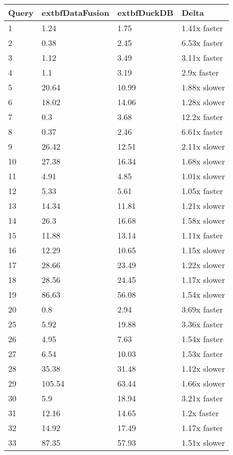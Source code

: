 \begin{table}[h]
\centering
\begin{tabular}{|l|l|l|l|}
\hline
Query & 	extbf{DataFusion} & 	extbf{DuckDB} & Delta \\
\hline
1 & 1.24 & 1.75 & 1.41x faster \\
\hline
2 & 0.38 & 2.45 & 6.53x faster \\
\hline
3 & 1.12 & 3.49 & 3.11x faster \\
\hline
4 & 1.1 & 3.19 & 2.9x faster \\
\hline
5 & 20.64 & 10.99 & 1.88x slower \\
\hline
6 & 18.02 & 14.06 & 1.28x slower \\
\hline
7 & 0.3 & 3.68 & 12.2x faster \\
\hline
8 & 0.37 & 2.46 & 6.61x faster \\
\hline
9 & 26.42 & 12.51 & 2.11x slower \\
\hline
10 & 27.38 & 16.34 & 1.68x slower \\
\hline
11 & 4.91 & 4.85 & 1.01x slower \\
\hline
12 & 5.33 & 5.61 & 1.05x faster \\
\hline
13 & 14.34 & 11.81 & 1.21x slower \\
\hline
14 & 26.3 & 16.68 & 1.58x slower \\
\hline
15 & 11.88 & 13.14 & 1.11x faster \\
\hline
16 & 12.29 & 10.65 & 1.15x slower \\
\hline
17 & 28.66 & 23.49 & 1.22x slower \\
\hline
18 & 28.56 & 24.45 & 1.17x slower \\
\hline
19 & 86.63 & 56.08 & 1.54x slower \\
\hline
20 & 0.8 & 2.94 & 3.69x faster \\
\hline
25 & 5.92 & 19.88 & 3.36x faster \\
\hline
26 & 4.95 & 7.63 & 1.54x faster \\
\hline
27 & 6.54 & 10.03 & 1.53x faster \\
\hline
28 & 35.38 & 31.48 & 1.12x slower \\
\hline
29 & 105.54 & 63.44 & 1.66x slower \\
\hline
30 & 5.9 & 18.94 & 3.21x faster \\
\hline
31 & 12.16 & 14.65 & 1.2x faster \\
\hline
32 & 14.92 & 17.49 & 1.17x faster \\
\hline
33 & 87.35 & 57.93 & 1.51x slower \\

\end{tabular}
\end{table}
